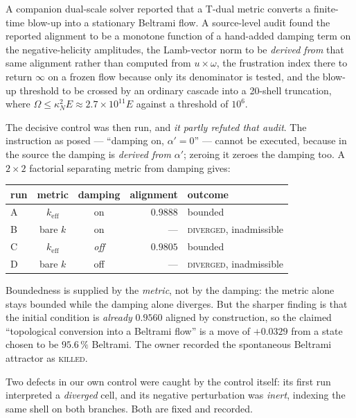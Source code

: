 \documentclass[11pt,a4paper]{article}
\theoremstyle{definition}
\theoremstyle{plain}
\begin{document}
A companion dual-scale solver reported that a T-dual metric converts a finite-time blow-up into a
stationary Beltrami flow. A source-level audit found the reported alignment to be a monotone
function of a hand-added damping term on the negative-helicity amplitudes, the Lamb-vector norm to
be \emph{derived from} that same alignment rather than computed from $u\times\omega$, the
frustration index there to return $\infty$ on a frozen flow because only its denominator is tested,
and the blow-up threshold to be crossed by an ordinary cascade into a 20-shell truncation, where
$\Omega\le\kappa_N^2E\approx2.7\times10^{11}E$ against a threshold of $10^6$.

The decisive control was then run, and \emph{it partly refuted that audit}. The instruction as
posed --- ``damping on, $\alpha'=0$'' --- cannot be executed, because in the source the damping is
\emph{derived from} $\alpha'$; zeroing it zeroes the damping too. A $2\times2$ factorial separating
metric from damping gives:

\begin{center}
\begin{tabular}{@{}lccrl@{}}
\toprule
\textbf{run} & \textbf{metric} & \textbf{damping} & \textbf{alignment} & \textbf{outcome} \\
\midrule
A & $k_{\mathrm{eff}}$ & on & $0.9888$ & bounded \\
B & bare $k$ & on & --- & \textsc{diverged}, inadmissible \\
C & $k_{\mathrm{eff}}$ & \emph{off} & $0.9805$ & bounded \\
D & bare $k$ & off & --- & \textsc{diverged}, inadmissible \\
\bottomrule
\end{tabular}
\end{center}

Boundedness is supplied by the \emph{metric}, not by the damping: the metric alone stays bounded
while the damping alone diverges. But the sharper finding is that the initial condition is
\emph{already} $0.9560$ aligned by construction, so the claimed ``topological conversion into a
Beltrami flow'' is a move of $+0.0329$ from a state chosen to be $95.6\,\%$ Beltrami. The owner
recorded the spontaneous Beltrami attractor as \textsc{killed}.

Two defects in our own control were caught by the control itself: its first run interpreted a
\emph{diverged} cell, and its negative perturbation was \emph{inert}, indexing the same shell on
both branches. Both are fixed and recorded.
\end{document}
